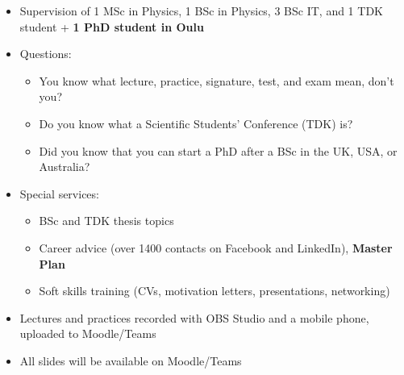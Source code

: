 \documentclass[t,aspectratio=169]{beamer}
\begin{document}
\begin{frame}
\begin{itemize}
\begin{itemize}
\item 2024–2025: \textit{NASA Goddard Space Flight Center, Greenbelt, MD, USA} – External Contractor (Visiting Scientist in 2016, 2017, 2023)
\item \textbf{2025–present: Obuda University, Faculty of Electrical Engineering, Budapest}~–~Teaching Physics for BSc Electrical Engineering students
\end{itemize}
\pagebreak
\item Supervision of 1 MSc in Physics, 1 BSc in Physics, 3 BSc IT, and 1 TDK student + \textbf{ 1 PhD student in Oulu}
\item Questions:
\begin{itemize}
\item You know what lecture, practice, signature, test, and exam mean, don’t you?
\item Do you know what a Scientific Students’ Conference (TDK) is?
\item Did you know that you can start a PhD after a BSc in the UK, USA, or Australia?
\end{itemize}
\item Special services:
 \begin{itemize}
\setlength{\parskip}{0pt}
\setlength{\itemsep}{0pt}
\item BSc and TDK thesis topics
\item Career advice (over 1400 contacts on Facebook and LinkedIn), \textbf{Master Plan}
\item Soft skills training (CVs, motivation letters, presentations, networking)
\end{itemize}
\item Lectures and practices recorded with OBS Studio and a mobile phone, uploaded to Moodle/Teams
\item All slides will be available on Moodle/Teams
\end{itemize}
\end{frame}



\end{document}
